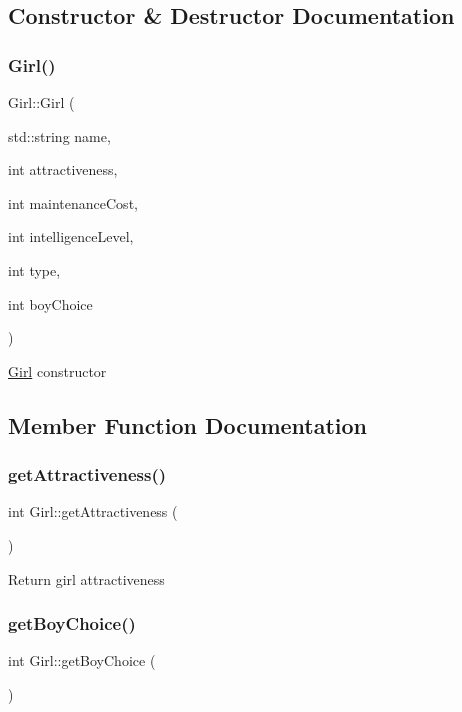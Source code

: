 \subsection{Constructor \& Destructor Documentation}
\mbox{\label{class_girl_a1a8fcd5a2b2d09ad68b8d987a42820fa}} 
\subsubsection{\texorpdfstring{Girl()}{Girl()}}
{\footnotesize\ttfamily Girl\+::\+Girl (\begin{DoxyParamCaption}\item[{std\+::string}]{name,  }\item[{int}]{attractiveness,  }\item[{int}]{maintenance\+Cost,  }\item[{int}]{intelligence\+Level,  }\item[{int}]{type,  }\item[{int}]{boy\+Choice }\end{DoxyParamCaption})}

\hyperlink{class_girl}{Girl} constructor 

\subsection{Member Function Documentation}
\mbox{\label{class_girl_a04cfe3e0c21240f92c19152630a40252}} 
\subsubsection{\texorpdfstring{get\+Attractiveness()}{getAttractiveness()}}
{\footnotesize\ttfamily int Girl\+::get\+Attractiveness (\begin{DoxyParamCaption}{ }\end{DoxyParamCaption})}

Return girl attractiveness \mbox{\label{class_girl_a23ed372fae6fc44694d5ffa39fa455cb}} 
\subsubsection{\texorpdfstring{get\+Boy\+Choice()}{getBoyChoice()}}
{\footnotesize\ttfamily int Girl\+::get\+Boy\+Choice (\begin{DoxyParamCaption}{ }\end{DoxyParamCaption})}

